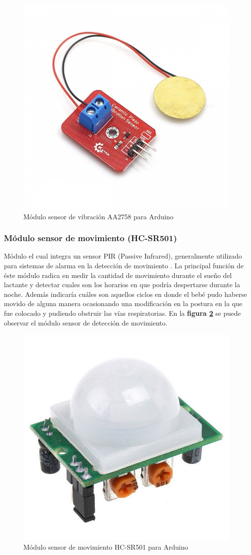 \documentclass{IEEEtran}
\begin{document}
				\begin{figure}
					\centering
					\includegraphics[width=0.5\linewidth]{arduino-modulo-vibracion}
					\caption{Módulo sensor de vibración AA2758 para Arduino}
					\label{arduino-modulo-vibracion}
				\end{figure}

			\subsubsection{Módulo sensor de movimiento (\textbf{HC-SR501})}
			
				Módulo el cual integra un sensor PIR (Passive Infrared), generalmente utilizado para sistemas de alarma en la detección de movimiento \cite{movimientotecnico}. La principal función de éste módulo radica en medir la cantidad de movimiento durante el sueño del lactante y detectar cuales son los horarios en que podría despertarse durante la noche. Además indicaría cuáles son aquellos ciclos en donde el bebé pudo haberse movido de alguna manera ocasionando una modificación en la postura en la que fue colocado y pudiendo obstruir las vías respiratorias. En la \textbf{figura \ref{arduino-modulo-movimiento}} se puede observar el módulo sensor de detección de movimiento.

				\begin{figure}
					\centering
					\includegraphics[width=0.5\linewidth]{arduino-modulo-movimiento}
					\caption{Módulo sensor de movimiento HC-SR501 para Arduino}
					\label{arduino-modulo-movimiento}
				\end{figure}
\end{document}
